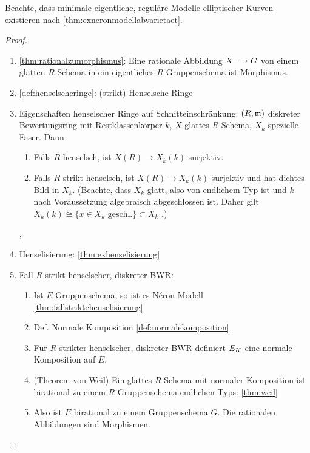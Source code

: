 \documentclass[german]{scrreprt}
\begin{document}
\begin{Satz}
  Beachte, dass minimale eigentliche, reguläre Modelle elliptischer
  Kurven existieren nach \autoref{thm:exneronmodellabvarietaet}.
  \begin{proof}
    \begin{enumerate}
    \item \autoref{thm:rationalzumorphismus}:
      Eine rationale Abbildung $X\dashrightarrow G$ von einem glatten
      $R$-Schema in ein eigentliches $R$-Gruppenschema ist Morphismus.
    \item \autoref{def:henselscheringe}: (strikt) Henselsche Ringe
    \item Eigenschaften henselscher Ringe auf Schnitteinschränkung:
      $(R,\mathfrak{m})$ diskreter Bewertungsring mit Restklassenkörper $k$, $X$
      glattes $R$-Schema, $X_k$ spezielle Faser.
      Dann
      \begin{enumerate}[label=(\roman*)]
      \item Falls $R$ henselsch, ist $X(R)\to X_k(k)$ surjektiv.
      \item Falls $R$ strikt henselsch, ist $X(R)\to X_k(k)$ surjektiv
        und hat dichtes Bild in $X_k$.
        (Beachte, dass $X_k$ glatt, also von endlichem Typ ist und $k$
        nach Voraussetzung algebraisch abgeschlossen ist. Daher
        gilt $X_k(k)\cong\{x\in X_k\text{ geschl.}\}\subset X_k$
        \cite[Example 4.1]{wedhorn}.)
      \end{enumerate}
      \cite[Proposition IV.6.4]{silverman2},
      \cite[2.3, Proposition 5]{neron}
    \item Henselisierung: \autoref{thm:exhenselisierung}
    \item Fall $R$ strikt henselscher, diskreter BWR:
      \begin{enumerate}
      \item Ist $E$ Gruppenschema, so ist es Néron-Modell
        \autoref{thm:fallstriktehenselisierung}
      \item Def. Normale Komposition \autoref{def:normalekomposition}
      \item Für $R$ strikter henselscher, diskreter BWR
        definiert $E_{K}$ eine normale Komposition auf $E$.
      \item (Theorem von Weil) Ein glattes $R$-Schema mit normaler
        Komposition ist birational zu einem $R$-Gruppenschema endlichen
        Typs: \autoref{thm:weil}
      \item Also ist $E$ birational zu einem Gruppenschema $G$.
        Die rationalen Abbildungen sind Morphismen.

\end{enumerate}
\end{enumerate}
\end{proof}
\end{Satz}
\end{document}
